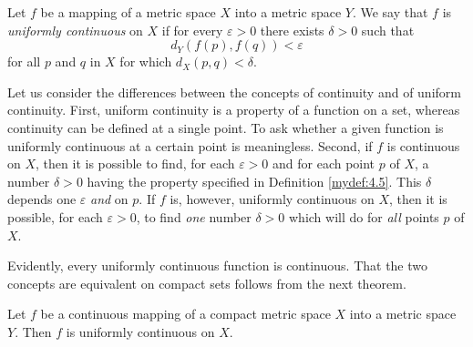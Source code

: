 \begin{mydef}
    \label{mydef:4.18}
    Let $f$ be a mapping of a metric space $X$ into a metric space $Y$.
    We say that $f$ is \emph{uniformly continuous} on $X$ 
    if for every $\varepsilon > 0$ there exists $\delta > 0$
    such that
    \begin{equation}
        \label{eq:4.15}
        d_Y(f(p),f(q)) < \varepsilon
    \end{equation}
    for all $p$ and $q$ in $X$ for which $d_X(p, q) < \delta$.
\end{mydef}
Let us consider the differences between the concepts of continuity and of
uniform continuity. 
First, uniform continuity is a property of a function on a set, 
whereas continuity can be defined at a single point. 
To ask whether a given function is uniformly continuous at a certain point is meaningless. 
Second, if $f$ is continuous on $X$, 
then it is possible to find, 
for each $\varepsilon > 0$ and for each point $p$ of $X$, 
a number $\delta > 0$ having the property specified in Definition \ref{mydef:4.5}. 
This $\delta$ depends one $\varepsilon$ \emph{and} on $p$. 
If $f$ is, however, uniformly continuous on $X$, 
then it is possible, for each $\varepsilon > 0$, 
to find \emph{one} number $\delta > 0$ which will do for \emph{all} points $p$ of $X$.

Evidently, every uniformly continuous function is continuous. 
That the two concepts are equivalent on compact sets follows from the next theorem. 

\begin{thm}
    \label{thm:4.19}
    Let $f$ be a continuous mapping of a compact metric space $X$ into a metric space $Y$. 
    Then $f$ is uniformly continuous on $X$.
\end{thm}

